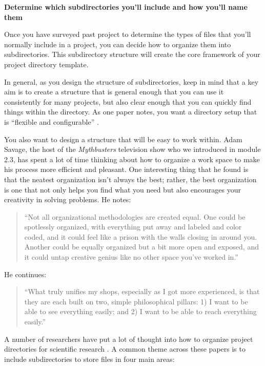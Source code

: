 \documentclass[]{tufte-book}
\begin{document}
\textbf{Determine which subdirectories you'll include and how you'll name them}

Once you have surveyed past project to determine the types of files that you'll
normally include in a project, you can decide how to organize them into
subdirectories. This subdirectory structure will create the core framework of
your project directory template.

In general, as you design the structure of subdirectories, keep in mind that a
key aim is to create a structure that is general enough that you can use it
consistently for many projects, but also clear enough that you can quickly find
things within the directory. As one paper notes, you want a directory setup that
is ``flexible and configurable'' \citep{blischak2019creating}.

You also want to design a structure that will be easy to work within. Adam
Savage, the host of the \emph{Mythbusters} television show who we introduced in
module 2.3, has spent a lot of time thinking about how to organize a work space
to make his process more efficient and pleasant. One interesting thing that he
found is that the neatest organization isn't always the best; rather, the best
organization is one that not only helps you find what you need but also
encourages your creativity in solving problems. He notes:

\begin{quote}
``Not all organizational methodologies are created equal. One could be spotlessly
organized, with everything put away and labeled and color coded, and it could feel
like a prison with the walls closing in around you. Another could be equally organized
but a bit more open and exposed, and it could untap creative genius like no other space
you've worked in.'' \citep{savage2020every}
\end{quote}

He continues:

\begin{quote}
``What truly unifies my shops, especially as I got more experienced, is that they are
each built on two, simple philosophical pillars: 1) I want to be able to see everything
easily; and 2) I want to be able to reach everything easily.'' \citep{savage2020every}
\end{quote}

A number of researchers have put a lot of thought into how to organize project
directories for scientific research \citep{vuorre2021sharing, prodigenr, blischak2019creating, marwick2018packaging, noble2009quick}. A common theme
across these papers is to include subdirectories to store files in four main
areas:
\end{document}
